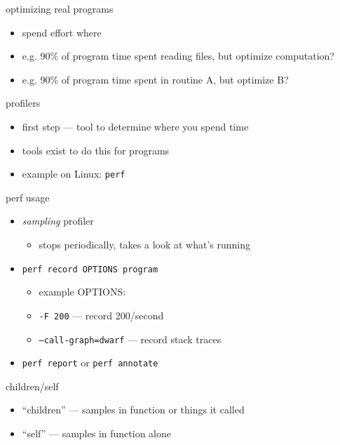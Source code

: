 \begin{frame}{optimizing real programs}
    \begin{itemize}
    \item spend effort where 
    \item e.g. 90\% of program time spent reading files, but optimize computation?
    \item e.g. 90\% of program time spent in routine A, but optimize B?
    \end{itemize}
\end{frame}

\begin{frame}{profilers}
    \begin{itemize}
    \item first step --- tool to determine where you spend time
    \item tools exist to do this for programs
    \item example on Linux: \texttt{perf}
    \end{itemize}
\end{frame}

\begin{frame}{perf usage}
    \begin{itemize}
    \item \textit{sampling} profiler
        \begin{itemize}
        \item stops periodically, takes a look at what's running
        \end{itemize}
    \item \texttt{perf record OPTIONS program}
        \begin{itemize}
        \item example OPTIONS:
        \item \texttt{-F 200} --- record 200/second
        \item \texttt{--call-graph=dwarf} --- record stack traces
        \end{itemize}
    \item \texttt{perf report} or \texttt{perf annotate}
    \end{itemize}
\end{frame}

\begin{frame}{children/self}
    \begin{itemize}
        \item ``children'' --- samples  in function or things it called
        \item ``self'' --- samples in function alone
    \end{itemize}
\end{frame}

